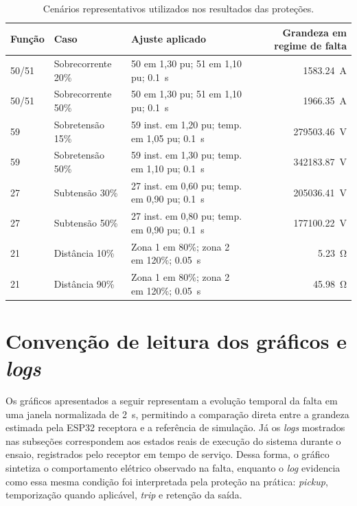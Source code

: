 \begin{table}[H]
  \centering
  \scriptsize
  \caption{Cenários representativos utilizados nos resultados das proteções.}
  \label{tab:cenarios-protecoes-resultados}
  \begin{tabular}{lllr}
    \toprule
    Função & Caso & Ajuste aplicado & Grandeza em regime de falta \\
    \midrule
    50/51 & Sobrecorrente 20\% & 50 em 1,30 pu; 51 em 1,10 pu; \SI{0,1}{\second} & \SI{1583,24}{\ampere} \\
    50/51 & Sobrecorrente 50\% & 50 em 1,30 pu; 51 em 1,10 pu; \SI{0,1}{\second} & \SI{1966,35}{\ampere} \\
    59 & Sobretensão 15\% & 59 inst. em 1,20 pu; temp. em 1,05 pu; \SI{0,1}{\second} & \SI{279503,46}{\volt} \\
    59 & Sobretensão 50\% & 59 inst. em 1,30 pu; temp. em 1,10 pu; \SI{0,1}{\second} & \SI{342183,87}{\volt} \\
    27 & Subtensão 30\% & 27 inst. em 0,60 pu; temp. em 0,90 pu; \SI{0,1}{\second} & \SI{205036,41}{\volt} \\
    27 & Subtensão 50\% & 27 inst. em 0,80 pu; temp. em 0,90 pu; \SI{0,1}{\second} & \SI{177100,22}{\volt} \\
    21 & Distância 10\% & Zona 1 em 80\%; zona 2 em 120\%; \SI{0,05}{\second} & \SI{5,23}{\ohm} \\
    21 & Distância 90\% & Zona 1 em 80\%; zona 2 em 120\%; \SI{0,05}{\second} & \SI{45,98}{\ohm} \\
    \bottomrule
  \end{tabular}
\end{table}

\section{Convenção de leitura dos gráficos e \textit{logs}}

Os gráficos apresentados a seguir representam a evolução temporal da falta em uma janela normalizada de \SI{2}{\second}, permitindo a comparação direta entre a grandeza estimada pela ESP32 receptora e a referência de simulação. Já os \textit{logs} mostrados nas subseções correspondem aos estados reais de execução do sistema durante o ensaio, registrados pelo receptor em tempo de serviço. Dessa forma, o gráfico sintetiza o comportamento elétrico observado na falta, enquanto o \textit{log} evidencia como essa mesma condição foi interpretada pela proteção na prática: \textit{pickup}, temporização quando aplicável, \textit{trip} e retenção da saída.

